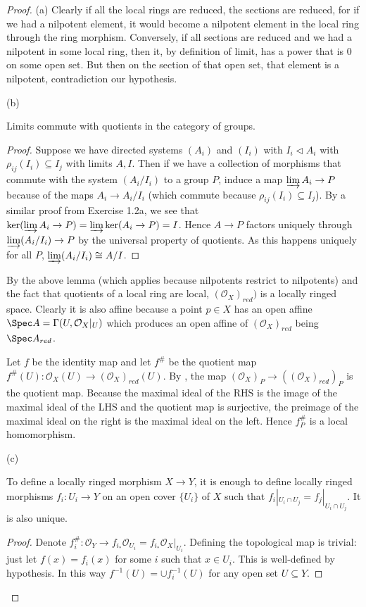 \begin{proof}
	(a) Clearly if all the local rings are reduced, the sections are reduced, for if we had a nilpotent element, it would become a nilpotent element in the local ring through the ring morphism.
	Conversely, if all sections are reduced and we had a nilpotent in some local ring, then it, by definition of limit, has a power that is $0$ on some open set.
	But then on the section of that open set, that element is a nilpotent, contradiction our hypothesis.

	(b) 
	\begin{lem}\label{lem:limquotient}
		Limits commute with quotients in the category of groups.
	\end{lem}
	\begin{proof}
		Suppose we have directed systems $(A_i) $ and $(I_i) $ with $I_i \triangleleft A_i$ with $\rho_{ij}(I_i) \subseteq I_j $ with limits $A, I $.
		Then if we have a collection of morphisms that commute with the system $(A_i / I_i)$ to a group $P $, induce a map $\varinjlim A_i \to P $ because of the maps $A_i \to A_i / I_i $ (which commute because $\rho_{ij}(I_i) \subseteq I_j $).
		By a similar proof from Exercise 1.2a, we see that $\ker(\varinjlim A_i \to P) = \varinjlim \ker (A_i \to P) = I$.
		Hence $A \to P $ factors uniquely through $\varinjlim (A_i /I_i) \to P $ by the universal property of quotients.
		As this happens uniquely for all $P $, $\varinjlim (A_i /I_i) \cong A / I $.
	\end{proof}

	By the above lemma (which applies because nilpotents restrict to nilpotents) and the fact that quotients of a local ring are local, $(\mathcal{O}_X)_{red}) $ is a locally ringed space.
	Clearly it is also affine because a point $p \in X $ has an open affine $\Spec A = \Gamma(U, \mathcal{O}_X|_U)$ which produces an open affine of $(\mathcal{O}_X)_{red} $ being $\Spec A_{red} $.

	Let $f $ be the identity map and let $f^\# $ be the quotient map $f^\#(U): \mathcal{O}_X(U) \to (\mathcal{O}_X)_{red}(U) $.
	By , the map $(\mathcal{O}_X)_P \to ((\mathcal{O}_X)_{red})_P$ is the quotient map.
	Because the maximal ideal of the RHS is the image of the maximal ideal of the LHS and the quotient map is surjective, the preimage of the maximal ideal on the right is the maximal ideal on the left.
	Hence $f^\#_P $ is a local homomorphism.

	(c) 
	\begin{lem}\label{lem:constsheafmorphism}
		To define a locally ringed morphism $X\to Y $, it is enough to define locally ringed morphisms $f_i: U_i \to Y$ on an open cover $\{U_i\}   $ of $X $ such that $f_i|_{U_i\cap U_j} = f_j|_{U_i\cap U_j}$.
		It is also unique.
	\end{lem}
	\begin{proof}
		Denote $f_i^\#: \mathcal{O}_Y \to f_{i_\ast} \mathcal{O}_{U_i} = f_{i_\ast} \mathcal{O}_X|_{U_i} $.
		Defining the topological map is trivial: just let $f(x) = f_i(x) $ for some $i $ such that $x\in U_i $.
		This is well-defined by hypothesis.
		In this way $f^{-1}(U) = \cup f_i^{-1}(U) $ for any open set $U \subseteq Y $.


\end{proof}
\end{proof}
